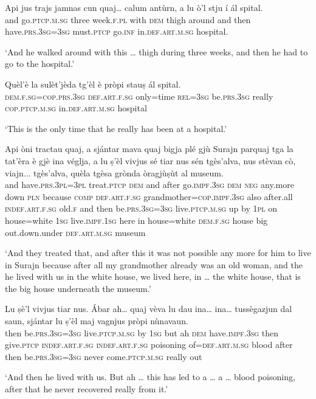 \begin{linenumbers}
\gll  Api jus trajs jamnas cun quaj… calum antùrn, a lu ò’l stju í ál spital.  \\
and go.\textsc{ptcp.m.sg} three week.\textsc{f.pl} with \textsc{dem} thigh around and then have.\textsc{prs.3sg=3sg} must.\textsc{ptcp} go.\textsc{inf} in.\textsc{def.art.m.sg} hospital. \\
\end{linenumbers}
\medskip
\glt `And he walked around with this … thigh during three weeks, and then he had to go to the hospital.'
\medskip

\begin{linenumbers}
\gll  Quèl’è la sulèt’jèda tg’èl è pròpi stauṣ ál spital.  \\
 \textsc{dem.f.sg=cop.prs.3sg} \textsc{def.art.f.sg} only=time \textsc{rel=3sg} be.\textsc{prs.3sg} really  \textsc{cop.ptcp.m.sg} in.\textsc{def.art.m.sg} hospital  \\
\end{linenumbers}
\medskip
\glt `This is the only time that he really has been at a hospital.'
\medskip

\begin{linenumbers}
\gll Api òni tractau quaj, a sjántar mava quaj bigja plé gjù Surajn parquaj tga la tat’èra è gjè ina véglja, a lu ṣ’èl vivjus sé tiar nus sén tgès’alva, nus stèvan cò, viajn... tgès’alva, quèla tgèsa grònda òragjùṣùt al museum.\\
and have.\textsc{prs.3pl=3pl} treat.\textsc{ptcp} \textsc{dem} and after go.\textsc{impf.3sg}  \textsc{dem} \textsc{neg} any.more down \textsc{pln} because \textsc{comp}  \textsc{def.art.f.sg} grandmother=\textsc{cop.impf.3sg} also after.all \textsc{indef.art.f.sg} old.\textsc{f} and then  be.\textsc{prs.3sg=3sg} live.\textsc{ptcp.m.sg} up by \textsc{1pl} on house=white \textsc{1sg} live.\textsc{impf.1sg} here in house=white \textsc{dem.f.sg} house big out.down.under \textsc{def.art.m.sg} museum \\
\end{linenumbers}
\medskip
\glt `And they treated that, and after this it was not possible any more for him to live in Surajn because after all my grandmother already was an old woman, and the he lived with us in the white house, we lived here,  in … the white house, that is the big house underneath the museum.'
\medskip

\begin{linenumbers}
\gll Lu ṣè’l vivjus tiar nus. Ábar ah… quaj vèva lu dau ina… ina… tussègazjun dal saun, sjántar lu ṣ’èl maj vagnjus pròpi nùnavaun.   \\
then be.\textsc{prs.3sg=3sg} live.\textsc{ptcp.m.sg} by \textsc{1sg} but ah \textsc{dem}  have.\textsc{impf.3sg} then give.\textsc{ptcp} \textsc{indef.art.f.sg} \textsc{indef.art.f.sg} poisoning of=\textsc{def.art.m.sg} blood after then be.\textsc{prs.3sg=3sg} never come.\textsc{ptcp.m.sg} really out \\
\end{linenumbers}
\medskip
\glt `And then he lived with us. But ah … this has led to a … a … blood poisoning, after that he never recovered really from it.'
\medskip


